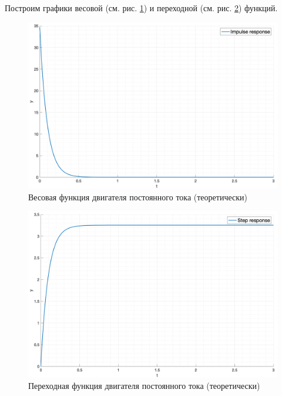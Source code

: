 Построим графики весовой (см. рис. \ref{fig:task1_impulse_response_eq}) и переходной (см. рис. \ref{fig:task1_step_response_eq}) функций.
\begin{figure}[ht!]
    \centering
    \includegraphics[width=\textwidth]{media/plots/task1_impulse_response_eq.png}
    \caption{Весовая функция двигателя постоянного тока (теоретически)}
    \label{fig:task1_impulse_response_eq}
\end{figure}
\begin{figure}[ht!]
    \centering
    \includegraphics[width=\textwidth]{media/plots/task1_step_response_eq.png}
    \caption{Переходная функция двигателя постоянного тока (теоретически)}
    \label{fig:task1_step_response_eq}
\end{figure}

